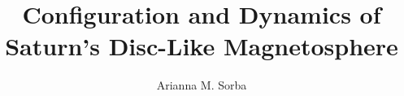 \documentclass[11pt,phd,a4paper,twoside]{ucl_thesis}
\title{Configuration and Dynamics of Saturn's Disc-Like Magnetosphere}
\author{Arianna M. Sorba}
\begin{document}
\nobibliography*









 




\end{document}
